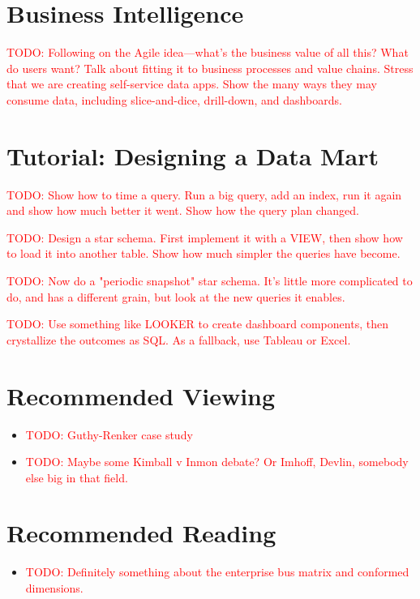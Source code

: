 \documentclass[11pt]{book}
\newcommand{\todo}[1]{\textcolor{red}{TODO: #1}} %
\begin{document}
\section{Business Intelligence}
\todo{Following on the Agile idea---what's the business value of all this? What do users want?  Talk about fitting it to business processes and value chains.  Stress that we are creating self-service data apps.  Show the many ways they may consume data, including slice-and-dice, drill-down, and dashboards.}


\section{Tutorial: Designing a Data Mart}

\todo{Show how to time a query.  Run a big query, add an index, run it again and show how much better it went.  Show how the query plan changed.}

\todo{Design a star schema.  First implement it with a VIEW, then show how to load it into another table.  Show how much simpler the queries have become.}

\todo{Now do a "periodic snapshot" star schema.  It's little more complicated to do, and has a different grain, but look at the new queries it enables.}

\todo{Use something like LOOKER to create dashboard components, then crystallize the outcomes as SQL.  As a fallback, use Tableau or Excel.}

\section*{Recommended Viewing}
\begin{itemize}
    \item \todo{Guthy-Renker case study}
    \item \todo{Maybe some Kimball v Inmon debate?  Or Imhoff, Devlin, somebody else big in that field.}
\end{itemize}

\section*{Recommended Reading}
\begin{itemize}
    \item \todo{Definitely something about the enterprise bus matrix and conformed dimensions.}
\end{itemize}
\end{document}
